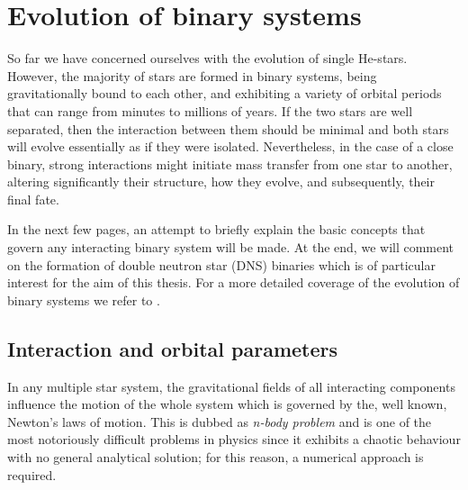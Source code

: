 \documentclass[../../main/thesis_msc.tex]{subfiles}
\begin{document}
					
				
	\section{Evolution of binary systems}
	
		So far we have concerned ourselves with the evolution of single He-stars. However, the majority of stars are formed in binary systems, being gravitationally bound to each other, and exhibiting a variety of orbital periods that can range from minutes to millions of years. If the two stars are well separated, then the interaction between them should be minimal and both stars will evolve essentially as if they were isolated. Nevertheless, in the case of a close binary, strong interactions might initiate mass transfer from one star to another, altering significantly their structure, how they evolve, and subsequently, their final fate.
		
		In the next few pages, an attempt to briefly explain the basic concepts that govern any interacting binary system will be made. At the end, we will comment on the formation of double neutron star (DNS) binaries which is of particular interest for the aim of this thesis. For a more detailed coverage of the evolution of binary systems we refer to \cite{podsiadlowski_2014, Postnov2014, Eggleton_book, Tauris_2006}.
		
			\subsection{Interaction and orbital parameters}
			
				In any multiple star system, the gravitational fields of all interacting components influence the motion of the whole system which is governed by the, well known, Newton's laws of motion. This is dubbed as \emph{n-body problem} and is one of the most notoriously difficult problems in physics since it exhibits a chaotic behaviour with no general analytical solution; for this reason, a numerical approach is required.
\end{document}
